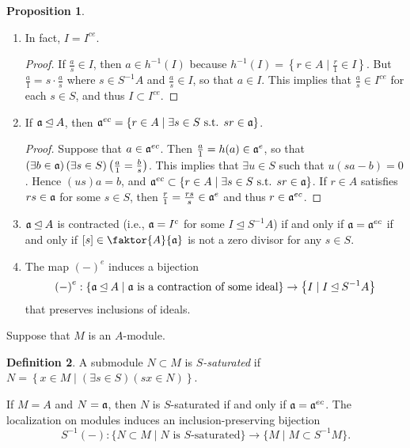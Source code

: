 \documentclass[10pt,letterpaper,cm]{nupset}
\theoremstyle{definition}
\newtheorem{definition}{Definition}[subsection]
\theoremstyle{theorem}
\newtheorem{prop}[definition]{Proposition}
\theoremstyle{remark}
\newcommand{\1}{\mathbf{1}}
\newcommand{\0}{\vec 0}
\begin{document}
\begin{prop} $ $
\begin{enumerate}
\item  In fact, $I = I^{ce}$.  
\begin{proof}
If $\frac{a}{s} \in I$, then $a\in h^{-1}(I)$ because $h^{-1}(I) = \left\{ r\in A \mid \frac{r}{1}\in I\right\}$. But $\frac{a}{1}  = s\cdot \frac{a}{s}$ where $s\in S^{-1}A$ and $\frac{a}{s} \in I$, so that $a\in I$. This implies that $\frac{a}{s} \in I^{ ce}$ for each $s\in S$, and thus $I\subset I^{ce}$. 
\end{proof}
\item If $\frak{a} \unlhd A$, then $\frak{a}^{ec} = \left\{r\in A  \mid \exists s \in S \text{ s.t. } sr \in \frak{a}\right\}$. 
\begin{proof}
Suppose that $a\in \frak{a}^{ec}$. Then $\frac{a}{1} = h(a) \in  \frak{a}^e$, so that $\left(\exists b \in \frak{a}\right)\left(\exists s \in S\right)\left(\frac{a}{1} = \frac{b}{s}\right)$. This implies that $\exists u \in S$ such that $u(sa - b) =0$. Hence $\left(us\right)a = b$, and $\frak{a}^{ec} \subset \left\{r\in A  \mid \exists s \in S \text{ s.t. } sr \in \frak{a}\right\}$.  If $r\in A$ satisfies $rs \in \frak{a}$ for some $s\in S$, then $\frac{r}{1} = \frac{rs}{s} \in \frak{a}^e$ and thus $r \in \frak{a}^{ec}$. 
\end{proof}
\item $\frak{a} \unlhd A$ is contracted (i.e., $\frak{a} = I^c$ for some $I \unlhd S^{-1}A$) if and only if $\frak{a} = \frak{a}^{ec}$ if and only if $[s] \in \faktor{A}{\frak{a}}$ is not a zero divisor for any $s\in S$.
\item The map $\left(-\right)^e$ induces a bijection $$\left(-\right)^e : \left\{\frak{a} \unlhd A \mid \frak{a} \text{ is a contraction of some ideal} \right\} \to \left\{I \mid I \unlhd S^{-1}A\right\}$$ that preserves inclusions of ideals.
\end{enumerate}
\end{prop}

\smallskip

 Suppose that $M$ is an $A$-module. 
\begin{definition}
A submodule $N \subset M$ is \textit{$S$-saturated} if $N=\left \{x \in M \mid \left(\exists s \in S\right)\left(sx\in N\right)\right\}$.
\end{definition} 
If $M=A$ and $N= \frak{a}$, then $N$ is $S$-saturated if and only if $\frak{a} = \frak{a}^{ec}$. The localization on modules induces an inclusion-preserving bijection $$S^{-1}(-) : \{N \subset M \mid N \text{ is } S\text{-saturated}\} \to \{M \mid M \subset S^{-1}M\}.$$
\end{document}
